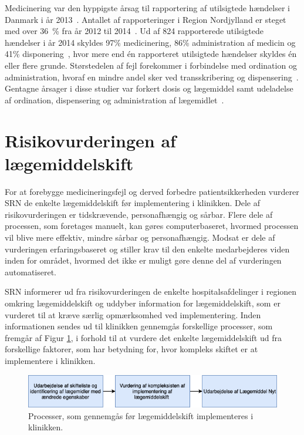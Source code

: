 Medicinering var den hyppigste årsag til rapportering af utilsigtede hændelser i Danmark i år 2013~\citep{Patientombuddet2013}. Antallet af rapporteringer i Region Nordjylland er steget med over 36~\% fra år 2012 til 2014~\citep{Jensen2014}. Ud af 824 rapporterede utilsigtede hændelser i år 2014 skyldes 97\% medicinering, 86\% administration af medicin og 41\% disponering~\citep{Jensen2014}, hvor mere end én rapporteret utilsigtede hændelser skyldes én eller flere grunde. Størstedelen af fejl forekommer i forbindelse med ordination og administration, hvoraf en mindre andel sker ved transskribering og dispensering~\citep{Agrawal2009, Anderson2002}. Gentagne årsager i disse studier var forkert dosis og lægemiddel samt udeladelse af ordination, dispensering og administration af lægemidlet~\citep{Barker2002,Sundhedsstyrelsen2005,Lisby2005, Tully2009}.

\section{Risikovurderingen af lægemiddelskift} \label{sec:ImpLaeg}
For at forebygge medicineringsfejl og derved forbedre patientsikkerheden vurderer SRN de enkelte lægemiddelskift før implementering i klinikken. Dele af risikovurderingen er tidskrævende, personafhængig og sårbar. Flere dele af processen, som foretages manuelt, kan gøres computerbaseret, hvormed processen vil blive mere effektiv, mindre sårbar og personafhængig. Modsat er dele af vurderingen erfaringsbaseret og stiller krav til den enkelte medarbejderes viden inden for området, hvormed det ikke er muligt gøre denne del af vurderingen automatiseret.

SRN informerer ud fra risikovurderingen de enkelte hospitalsafdelinger i regionen omkring lægemiddelskift og uddyber information for lægemiddelskift, som er vurderet til at kræve særlig opmærksomhed ved implementering. Inden informationen sendes ud til klinikken gennemgås forskellige processer, som fremgår af Figur \ref{fig:Proces}, i forhold til at vurdere det enkelte lægemiddelskift ud fra forskellige faktorer, som har betydning for, hvor kompleks skiftet er at implementere i klinikken.

\begin{figure}[H]\centering	\includegraphics[width=1\textwidth]{billeder/proces.png} 
	\caption{Processer, som gennemgås før lægemiddelskift implementeres i klinikken.}\label{fig:Proces}  
\end{figure}

